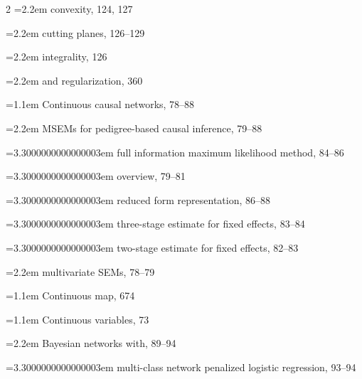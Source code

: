 \begin{multicols}{2}
\noindent\hangindent=2.2em \hspace*{1.1em}convexity, 124, 127\par
\noindent\hangindent=2.2em \hspace*{1.1em}cutting planes, 126--129\par
\noindent\hangindent=2.2em \hspace*{1.1em}integrality, 126\par
\noindent\hangindent=2.2em \hspace*{1.1em}and regularization, 360\par
\noindent\hangindent=1.1em Continuous causal networks, 78--88\par
\noindent\hangindent=2.2em \hspace*{1.1em}MSEMs for pedigree-based causal inference, 79--88\par
\noindent\hangindent=3.3000000000000003em \hspace*{2.2em}full information maximum likelihood method, 84--86\par
\noindent\hangindent=3.3000000000000003em \hspace*{2.2em}overview, 79--81\par
\noindent\hangindent=3.3000000000000003em \hspace*{2.2em}reduced form representation, 86--88\par
\noindent\hangindent=3.3000000000000003em \hspace*{2.2em}three-stage estimate for fixed effects, 83--84\par
\noindent\hangindent=3.3000000000000003em \hspace*{2.2em}two-stage estimate for fixed effects, 82--83\par
\noindent\hangindent=2.2em \hspace*{1.1em}multivariate SEMs, 78--79\par
\noindent\hangindent=1.1em Continuous map, 674\par
\noindent\hangindent=1.1em Continuous variables, 73\par
\noindent\hangindent=2.2em \hspace*{1.1em}Bayesian networks with, 89--94\par
\noindent\hangindent=3.3000000000000003em \hspace*{2.2em}multi-class network penalized logistic regression, 93--94\par

\end{multicols}
